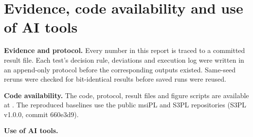 \section{Evidence, code availability and use of AI tools}
\label{app:evidence}
\textbf{Evidence and protocol.} Every number in this report is traced to a
committed result file. Each test's decision rule, deviations and execution log
were written in an append-only protocol before the corresponding outputs
existed. Same-seed reruns were checked for bit-identical results before saved
runs were reused.

\textbf{Code availability.} The code, protocol, result files and figure
scripts are available at . The
reproduced baselines use the public msiPL and S3PL repositories (S3PL
v1.0.0, commit 660e3d9).

\textbf{Use of AI tools.} 
